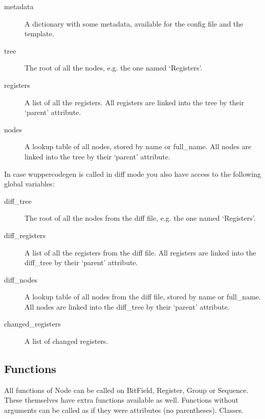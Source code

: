 \documentclass[letterpaper,10pt,english]{sphinxmanual}
\begin{document}
\begin{description}
\item[{metadata}] \leavevmode
A dictionary with some metadata, available for the config file and the template.

\item[{tree}] \leavevmode
The root of all the nodes, e.g. the one named `Registers'.

\item[{registers}] \leavevmode
A list of all the registers. All registers are linked into the tree by
their `parent' attribute.

\item[{nodes}] \leavevmode
A lookup table of all nodes, stored by name or full\_name. All nodes are linked
into the tree by their `parent' attribute.

\end{description}

In case wuppercodegen is called in \sphinxquotedblleft{}diff\sphinxquotedblright{} mode you also have access to the following global variables:
\begin{description}
\item[{diff\_tree}] \leavevmode
The root of all the nodes from the diff file, e.g. the one named `Registers'.

\item[{diff\_registers}] \leavevmode
A list of all the registers from the diff file. All registers are linked into the diff\_tree by
their `parent' attribute.

\item[{diff\_nodes}] \leavevmode
A lookup table of all nodes from the diff file, stored by name or full\_name. All nodes are linked
into the diff\_tree by their `parent' attribute.

\item[{changed\_registers}] \leavevmode
A list of changed registers.

\end{description}


\subsection{Functions}
\label{\detokenize{developer:functions}}
All functions of Node can be called on BitField, Register, Group or Sequence.
These themselves have extra functions available as well.
Functions without arguments can be called as if they were attributes (no parentheses).
\label{\detokenize{developer:module-wuppercodegen.classes}}
Classes.
\end{document}
